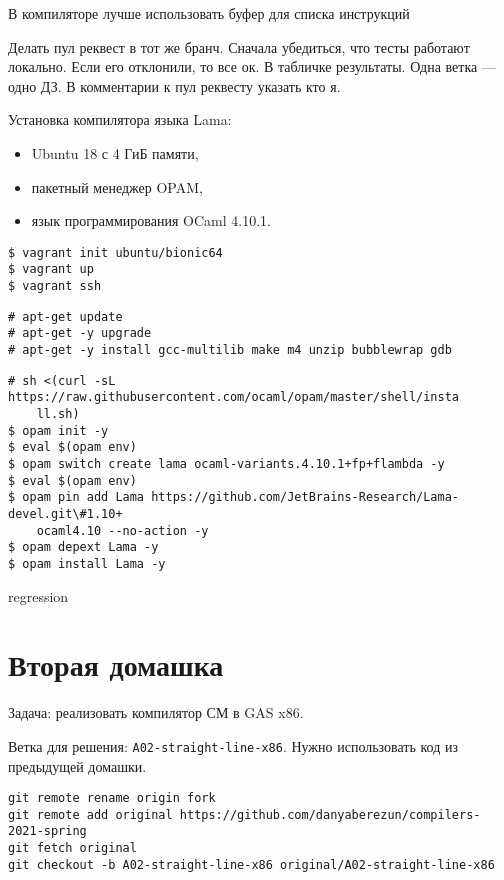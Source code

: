 В компиляторе лучше использовать буфер для списка инструкций

Делать пул реквест в тот же бранч. Сначала убедиться, что тесты работают
локально.
Если его отклонили, то все ок. В табличке результаты. Одна ветка --- одно ДЗ.
В комментарии к пул реквесту указать кто я.

Установка компилятора языка Lama:

\begin{itemize}
    \item Ubuntu 18 с 4 ГиБ памяти,
    \item пакетный менеджер OPAM,
    \item язык программирования OCaml 4.10.1.
\end{itemize}

\begin{Verbatim}
$ vagrant init ubuntu/bionic64
$ vagrant up
$ vagrant ssh
\end{Verbatim}

\begin{Verbatim}
# apt-get update
# apt-get -y upgrade
# apt-get -y install gcc-multilib make m4 unzip bubblewrap gdb
\end{Verbatim}

\begin{Verbatim}
# sh <(curl -sL https://raw.githubusercontent.com/ocaml/opam/master/shell/insta
    ll.sh)
$ opam init -y
$ eval $(opam env)
$ opam switch create lama ocaml-variants.4.10.1+fp+flambda -y
$ eval $(opam env)
$ opam pin add Lama https://github.com/JetBrains-Research/Lama-devel.git\#1.10+
    ocaml4.10 --no-action -y
$ opam depext Lama -y
$ opam install Lama -y
\end{Verbatim}

regression 

\section{Вторая домашка}

Задача: реализовать компилятор СМ в GAS x86.

Ветка для решения: \texttt{A02-straight-line-x86}. Нужно использовать код из
предыдущей домашки. 

\begin{Verbatim}
git remote rename origin fork
git remote add original https://github.com/danyaberezun/compilers-2021-spring
git fetch original
git checkout -b A02-straight-line-x86 original/A02-straight-line-x86
\end{Verbatim}

